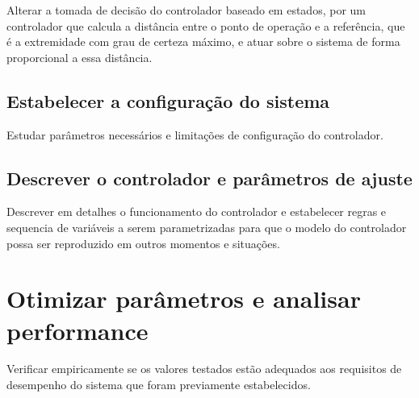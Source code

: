 Alterar a tomada de decisão do  controlador baseado em estados, por um controlador que calcula a distância entre o ponto de operação e a referência, que é a extremidade com grau de certeza máximo, e atuar sobre o sistema de forma proporcional a essa distância.


\subsection{ Estabelecer a configuração do sistema }
Estudar parâmetros necessários e limitações de configuração do controlador.

\subsection{ Descrever o controlador e parâmetros de ajuste }

Descrever em detalhes o funcionamento do controlador e estabelecer regras e sequencia de variáveis a serem parametrizadas para que o modelo do controlador possa ser reproduzido em outros momentos e situações.

\section{ Otimizar parâmetros e analisar performance }

Verificar empiricamente se os valores testados estão adequados aos requisitos de desempenho do sistema que foram previamente estabelecidos. 



